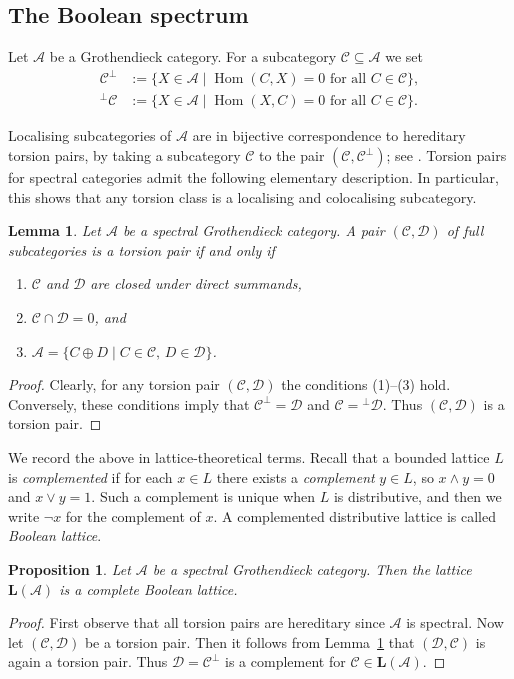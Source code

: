 \documentclass[a4paper]{amsart}
\theoremstyle{plain}
\newtheorem{prop}[thm]{Proposition}
\newtheorem{lem}[thm]{Lemma}
\theoremstyle{definition}
\theoremstyle{remark}
\numberwithin{equation}{section}
\newcommand{\Hom}{\operatorname{Hom}}
\def\A{\mathcal A}
\def\C{\mathcal C}
\def\D{\mathcal D}
\def\bfL{\mathbf L}
\begin{document}
\subsection*{The Boolean spectrum}

Let $\A$ be a Grothendieck category. For a subcategory $\C\subseteq\A$ we set
\begin{align*}
  \C^\perp&:=\{X\in\A\mid\Hom(C,X)=0\text{ for all }C\in\C\},\\
^\perp\C&:=\{X\in\A\mid\Hom(X,C)=0\text{ for all }C\in\C\}.
\end{align*}

Localising subcategories of $\A$ are in bijective correspondence to
hereditary torsion pairs, by taking a subcategory $\C$ to the pair
$(\C,\C^\perp)$; see \cite[VI.3]{St1975}. Torsion pairs for spectral
categories admit the following elementary description. In particular,
this shows that any torsion class is a localising and colocalising subcategory.

\begin{lem}\label{le:torsion}
    Let $\A$ be a spectral Grothendieck category. A pair  $(\C,\D)$ of
    full subcategories is a torsion pair if and only if
    \begin{enumerate}
      \item $\C$ and $\D$ are closed under direct summands,
      \item $\C\cap\D=0$, and
        \item $\A=\{C\oplus D\mid C\in\C,\, D\in\D\}$.
\end{enumerate}
\end{lem}
\begin{proof}
Clearly, for any  torsion pair $(\C,\D)$ the conditions (1)--(3) hold. Conversely,
these conditions  imply that $\C^\perp=\D$ and $\C={^\perp\D}$. Thus  $(\C,\D)$ is a torsion pair.
\end{proof}

We record the above in lattice-theoretical terms. Recall that a
bounded lattice $L$ is \emph{complemented} if for each $x\in L$ there
exists a \emph{complement} $y\in L$, so $x\wedge y=0$ and $x\vee
y=1$. Such a complement is unique when $L$ is distributive, and then
we write $\neg x$ for the complement of $x$. A
complemented distributive lattice is called \emph{Boolean lattice}.

\begin{prop}\label{pr:Boole}
  Let $\A$ be a spectral Grothendieck category.  Then the lattice
  $\bfL(\A)$ is a complete Boolean lattice.
\end{prop}
\begin{proof}
  First observe that all torsion pairs are hereditary since $\A$ is
  spectral.  Now let $(\C,\D)$ be a torsion pair. Then it follows from
  Lemma~\ref{le:torsion} that $(\D,\C)$ is again a torsion pair. Thus
  $\D=\C^\perp$ is a complement for $\C\in\bfL(\A)$.
\end{proof}
\end{document}
